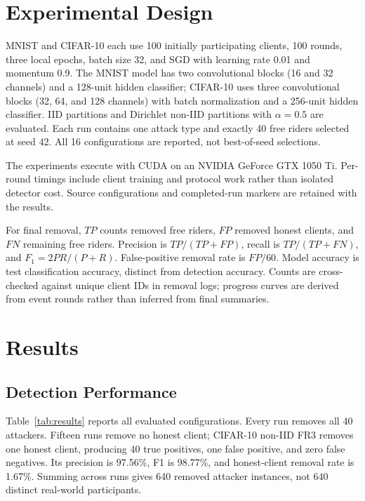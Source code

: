 \documentclass[conference]{IEEEtran}
\begin{document}
\section{Experimental Design}
MNIST \cite{lecun1998gradient} and CIFAR-10 \cite{krizhevsky2009learning} each use 100 initially participating clients, 100 rounds, three local epochs, batch size 32, and SGD with learning rate 0.01 and momentum 0.9. The MNIST model has two convolutional blocks (16 and 32 channels) and a 128-unit hidden classifier; CIFAR-10 uses three convolutional blocks (32, 64, and 128 channels) with batch normalization and a 256-unit hidden classifier. IID partitions and Dirichlet non-IID partitions with $\alpha=0.5$ are evaluated. Each run contains one attack type and exactly 40 free riders selected at seed 42. All 16 configurations are reported, not best-of-seed selections.

The experiments execute with CUDA on an NVIDIA GeForce GTX 1050 Ti. Per-round timings include client training and protocol work rather than isolated detector cost. Source configurations and completed-run markers are retained with the results.

For final removal, $TP$ counts removed free riders, $FP$ removed honest clients, and $FN$ remaining free riders. Precision is $TP/(TP+FP)$, recall is $TP/(TP+FN)$, and $F_1=2PR/(P+R)$. False-positive removal rate is $FP/60$. Model accuracy is test classification accuracy, distinct from detection accuracy. Counts are cross-checked against unique client IDs in removal logs; progress curves are derived from event rounds rather than inferred from final summaries.

\section{Results}
\subsection{Detection Performance}
Table~\ref{tab:results} reports all evaluated configurations. Every run removes all 40 attackers. Fifteen runs remove no honest client; CIFAR-10 non-IID FR3 removes one honest client, producing 40 true positives, one false positive, and zero false negatives. Its precision is 97.56\%, F1 is 98.77\%, and honest-client removal rate is 1.67\%. Summing across runs gives 640 removed attacker instances, not 640 distinct real-world participants.
\end{document}
